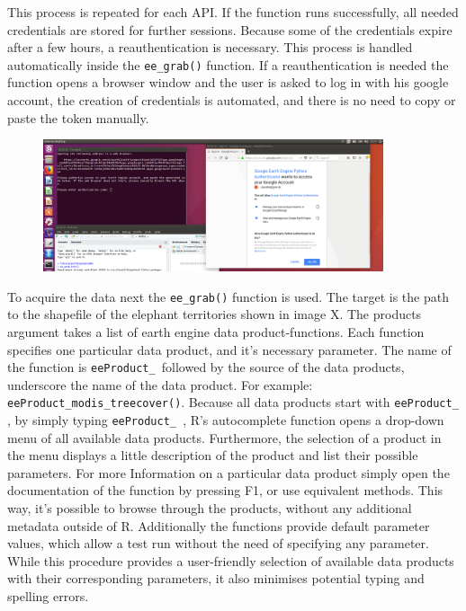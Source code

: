 This process is repeated for each API. If the function runs successfully, all needed credentials are stored for further sessions. Because some of the credentials expire after a few hours, a reauthentication is necessary. This process is handled automatically inside the \texttt{ee\_grab()} function. If a reauthentication is needed the function opens a browser window and the user is asked to log in with his google account, the creation of credentials is automated, and there is no need to copy or paste the token manually.

\begin{center}
	\begin{figure}[h]
		\begin{center}
			\includegraphics[width=10cm]{images/install_authentication.png}
			\label{install}
		\end{center}
	\end{figure}
\end{center}



To acquire the data next the \texttt{ee\_grab()} function is used. The target is the path to the shapefile of the elephant territories shown in image X. The products argument takes a list of earth engine data product-functions. Each function specifies one particular data product, and it's necessary parameter. The name of the function is \texttt{eeProduct\_ }followed by the source of the data products, underscore the name of the data product. For example: \texttt{eeProduct\_modis\_treecover()}. Because all data products start with \texttt{eeProduct\_ }, by simply typing \texttt{eeProduct\_ }, R's autocomplete function opens a drop-down menu of all available data products. Furthermore, the selection of a product in the menu displays a little description of the product and list their possible parameters. For more Information on a particular data product simply open the documentation of the function by pressing F1, or use equivalent methods. This way, it's possible to browse through the products, without any additional metadata outside of R. Additionally the functions provide default parameter values, which allow a test run without the need of specifying any parameter. While this procedure provides a user-friendly selection of available data products with their corresponding parameters, it also minimises potential typing and spelling errors.

